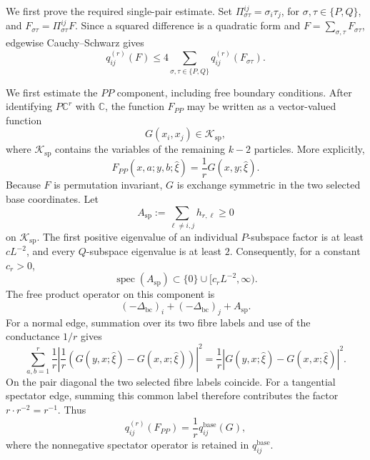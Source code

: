\documentclass[11pt]{article}
\numberwithin{equation}{section}
\theoremstyle{remark}
\newcommand{\1}{\mathbf 1}
\begin{document}
We first prove the required single-pair estimate.  Set
\(\Pi_{\sigma\tau}^{ij}=\sigma_i\tau_j\), for
\(\sigma,\tau\in\{P,Q\}\), and
\(F_{\sigma\tau}=\Pi_{\sigma\tau}^{ij}F\).  Since a squared difference
is a quadratic form and \(F=\sum_{\sigma,\tau}F_{\sigma\tau}\),
edgewise Cauchy--Schwarz gives
\begin{equation}
 q_{ij}^{(r)}(F)
 \leq4\sum_{\sigma,\tau\in\{P,Q\}}
 q_{ij}^{(r)}(F_{\sigma\tau}).
 \label{eq:decorated-channel-cauchy}
\end{equation}

We first estimate the \(PP\) component, including free boundary conditions.
After identifying \(P\mathbb C^r\) with \(\mathbb C\), the function
\(F_{PP}\) may be written as a vector-valued function
\[
 G(x_i,x_j)\in\mathcal K_{\mathrm{sp}},
\]
where \(\mathcal K_{\mathrm{sp}}\) contains the variables of the remaining
\(k-2\) particles.  More explicitly,
\begin{equation}
 F_{PP}(x,a;y,b;\widehat\xi)=\frac1rG(x,y;\widehat\xi).
 \label{eq:PP-unitary-identification}
\end{equation}
Because \(F\) is permutation invariant, \(G\) is exchange symmetric in
the two selected base coordinates.  Let
\[
 A_{\mathrm{sp}}:=\sum_{\ell\ne i,j}h_{r,\ell}\geq0
\]
on \(\mathcal K_{\mathrm{sp}}\).  The first positive eigenvalue of an
individual \(P\)-subspace factor is at least \(cL^{-2}\), and every
\(Q\)-subspace eigenvalue is at least \(2\).  Consequently, for a constant
\(c_r>0\),
\begin{equation}
 \operatorname{spec}(A_{\mathrm{sp}})
 \subset\{0\}\cup[c_rL^{-2},\infty).
 \label{eq:spectator-gap}
\end{equation}
The free product operator on this component is
\[
 (-\Delta_{\mathrm{bc}})_i+(-\Delta_{\mathrm{bc}})_j+A_{\mathrm{sp}}.
\]
For a normal edge, summation over its two fibre labels and use of the
conductance \(1/r\) gives
\[
 \sum_{a,b=1}^r\frac1r\left|\frac1r
 (G(y,x;\widehat\xi)-G(x,x;\widehat\xi))\right|^2
 =\frac1r|G(y,x;\widehat\xi)-G(x,x;\widehat\xi)|^2.
\]
On the pair diagonal the two selected fibre labels coincide.  For a
tangential spectator edge, summing this common label therefore contributes
the factor \(r\cdot r^{-2}=r^{-1}\).  Thus
\begin{equation}
 q_{ij}^{(r)}(F_{PP})=\frac1r q_{ij}^{\mathrm{base}}(G),
 \label{eq:PP-form-reduction}
\end{equation}
where the nonnegative spectator operator is retained in
\(q_{ij}^{\mathrm{base}}\).
\end{document}
